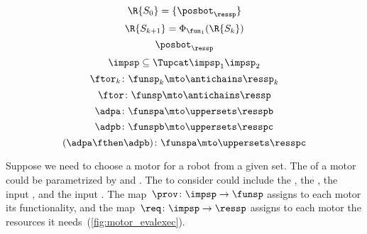 {\begin{forslides}
\begin{equation*}
			\label{eq:genfun_12}
			\R{S_0}=\{ \posbot_\ressp\}
		\end{equation*}
		\begin{equation*}
			\label{eq:genfun_13}
			\R{S_{k+1}}=\Phi_{\fun_1}(\R{S_k})
		\end{equation*}
		\begin{equation*}
			\label{eq:genfun_14}
			\posbot_{\ressp}
		\end{equation*}
		\begin{equation*}
			\label{eq:imp_comp}
			\impsp \subseteq \Tupcat \impsp_{1}  \impsp_{2}
		\end{equation*}
		\begin{equation*}
			\label{eq:dp_mob_4}
			\ftor_k\colon \funsp_k \mto \antichains \ressp_k
		\end{equation*}
		\begin{equation*}
			\label{eq:dp_mob_5}
			\ftor\colon \funsp \mto \antichains \ressp
		\end{equation*}
		\begin{equation*}
			\label{eq:dp_mob_6}
			\adpa\colon \funspa \mto \uppersets \resspb
		\end{equation*}
		\begin{equation*}
			\label{eq:dp_mob_7}
			\adpb\colon \funspb \mto \uppersets \resspc
		\end{equation*}
		\begin{equation*}
			\label{eq:dp_mob_8}
			(\adpa \fthen \adpb) \colon \funspa \mto \uppersets \resspc
		\end{equation*}
	\end{forslides}
}

\begin{example}
	\label{exa:motor}
	Suppose we need to choose a motor for a robot from a given set.
	The  of a motor could be parametrized by  and .
	The  to consider could include the \R{\unit[cost]{[USD]}}, the \R{\unit[mass]{[g]}}, the input \R{\unit[voltage]{[V]}}, and the input \R{\unit[current]{[A]}}.
	The map~$\prov \colon \impsp\to\funsp$ assigns to each motor its functionality, and the map~$\req \colon \impsp\rightarrow\ressp$ assigns to each motor the resources it needs~(\cref{fig:motor_evalexec}).
\end{example}

